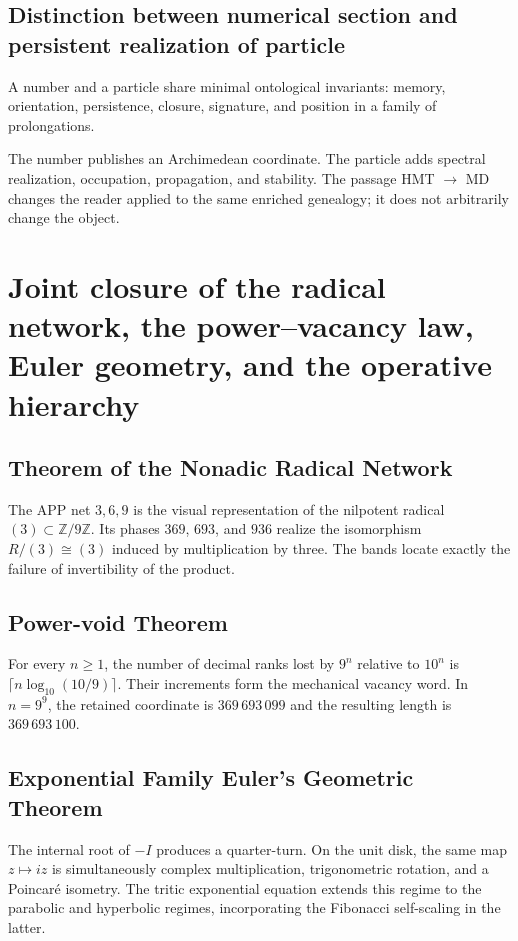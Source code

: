\subsection{Distinction between numerical section and persistent realization of particle}

A number and a particle share minimal ontological invariants: memory, orientation, persistence, closure, signature, and position in a family of prolongations.

The number publishes an Archimedean coordinate. The particle adds spectral realization, occupation, propagation, and stability. The passage HMT \(\to\) MD changes the reader applied to the same enriched genealogy; it does not arbitrarily change the object.


\section{Joint closure of the radical network, the power--vacancy law, Euler geometry, and the operative hierarchy}

\subsection{Theorem of the Nonadic Radical Network}

The APP net \(3,6,9\) is the visual representation of the nilpotent radical \((3)\subset\mathbb Z/9\mathbb Z\). Its phases \(369\), \(693\), and \(936\) realize the isomorphism \(R/(3)\cong(3)\) induced by multiplication by three. The bands locate exactly the failure of invertibility of the product.

\subsection{Power-void Theorem}

For every \(n\ge1\), the number of decimal ranks lost by \(9^n\) relative to \(10^n\) is \(\lceil n\log_{10}(10/9)\rceil\). Their increments form the mechanical vacancy word. In \(n=9^9\), the retained coordinate is \(369\,693\,099\) and the resulting length is \(369\,693\,100\).

\subsection{Exponential Family Euler's Geometric Theorem}

The internal root of \(-I\) produces a quarter-turn. On the unit disk, the same map \(z\mapsto iz\) is simultaneously complex multiplication, trigonometric rotation, and a Poincaré isometry. The tritic exponential equation extends this regime to the parabolic and hyperbolic regimes, incorporating the Fibonacci self-scaling in the latter.

